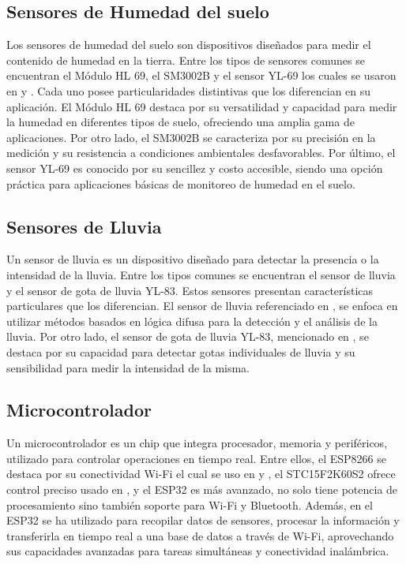 \subsection*{Sensores de Humedad del suelo}
Los sensores de humedad del suelo son dispositivos diseñados para medir el contenido de humedad en la tierra. Entre los tipos de sensores comunes se encuentran el Módulo HL 69, el SM3002B y el sensor YL-69 los cuales se usaron en \cite{alcivar_dominguez_sistema_2018} \cite{haiyan_intelligent_2022} y \cite{haiyan_intelligent_2022}. Cada uno posee particularidades distintivas que los diferencian en su aplicación. El Módulo HL 69 destaca por su versatilidad y capacidad para medir la humedad en diferentes tipos de suelo, ofreciendo una amplia gama de aplicaciones. Por otro lado, el SM3002B se caracteriza por su precisión en la medición y su resistencia a condiciones ambientales desfavorables. Por último, el sensor YL-69 es conocido por su sencillez y costo accesible, siendo una opción práctica para aplicaciones básicas de monitoreo de humedad en el suelo.

\subsection*{Sensores de Lluvia}
Un sensor de lluvia es un dispositivo diseñado para detectar la presencia o la intensidad de la lluvia. Entre los tipos comunes se encuentran el sensor de lluvia y el sensor de gota de lluvia YL-83. Estos sensores presentan características particulares que los diferencian. El sensor de lluvia referenciado en \cite{krishnan_fuzzy_2020}, se enfoca en utilizar métodos basados en lógica difusa para la detección y el análisis de la lluvia. Por otro lado, el sensor de gota de lluvia YL-83, mencionado en \cite{alcivar_dominguez_sistema_2018}, se destaca por su capacidad para detectar gotas individuales de lluvia y su sensibilidad para medir la intensidad de la misma.

\subsection{Microcontrolador}
Un microcontrolador es un chip que integra procesador, memoria y periféricos, utilizado para controlar operaciones en tiempo real. Entre ellos, el ESP8266 se destaca por su conectividad Wi-Fi el cual se uso en \cite{hasan_implementation_2018} y \cite{widyawati_fuzzy_2022}, el STC15F2K60S2 ofrece control preciso usado en \cite{haiyan_intelligent_2022}, y el ESP32 es más avanzado, no solo tiene potencia de procesamiento sino también soporte para Wi-Fi y Bluetooth. Además, en \cite{ramos_galindo_diseno_2023} el ESP32 se ha utilizado para recopilar datos de sensores, procesar la información y transferirla en tiempo real a una base de datos a través de Wi-Fi, aprovechando sus capacidades avanzadas para tareas simultáneas y conectividad inalámbrica.

